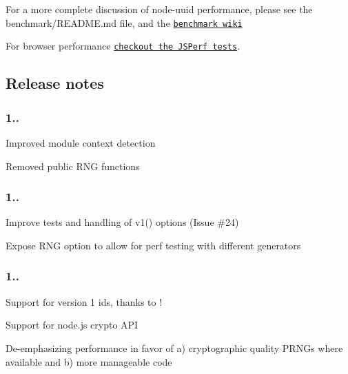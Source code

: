 For a more complete discussion of node-\/uuid performance, please see the {\ttfamily benchmark/\+R\+E\+A\+D\+M\+E.\+md} file, and the \href{https://github.com/broofa/node-uuid/wiki/Benchmark}{\tt benchmark wiki}

For browser performance \href{http://jsperf.com/node-uuid-performance}{\tt checkout the J\+S\+Perf tests}.

\subsection*{Release notes}

\subsubsection*{1..}


\begin{DoxyItemize}
\item Improved module context detection
\item Removed public R\+N\+G functions
\end{DoxyItemize}

\subsubsection*{1..}


\begin{DoxyItemize}
\item Improve tests and handling of v1() options (Issue \#24)
\item Expose R\+N\+G option to allow for perf testing with different generators
\end{DoxyItemize}

\subsubsection*{1..}


\begin{DoxyItemize}
\item Support for version 1 ids, thanks to \href{https://github.com/ctavan}{\tt }!
\item Support for node.\+js crypto A\+P\+I
\item De-\/emphasizing performance in favor of a) cryptographic quality P\+R\+N\+Gs where available and b) more manageable code 
\end{DoxyItemize}
